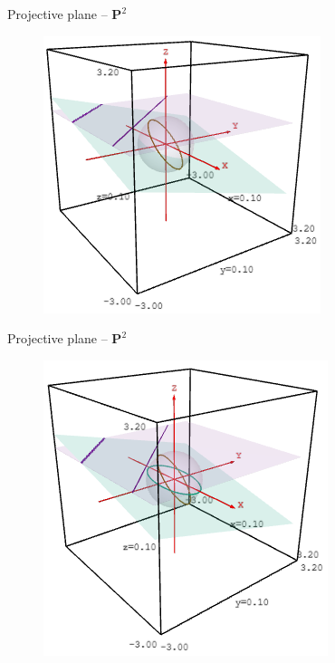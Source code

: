\documentclass[aspectratio=169,xcolor=dvipsnames]{beamer}
\begin{document}

\begin{frame}{Projective plane -- $\mathbf{P}^2$}
\begin{figure}
    \centering
    \href{https://doktor-ziel.github.io/ECC/projective-plane-09.html}{\includegraphics[height=0.6\textheight]{projective-plane-09.png}}
\end{figure}
\end{frame}


\begin{frame}{Projective plane -- $\mathbf{P}^2$}
\begin{figure}
    \centering
    \href{https://doktor-ziel.github.io/ECC/projective-plane-10.html}{\includegraphics[height=0.6\textheight]{projective-plane-10.png}}
\end{figure}
\end{frame}
\end{document}
